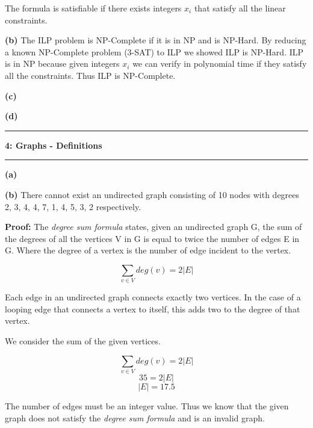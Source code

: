 \documentclass[11pt]{article}
\newcommand\question[2]{\vspace{.25in}\hrule\textbf{#1: #2}\vspace{.5em}\hrule\vspace{.10in}}
\renewcommand\part[1]{\vspace{.10in}\textbf{(#1)}}
\begin{document}
	The formula is satisfiable if there exists integers $x_i$ that satisfy all the linear constraints.
	
\part{b} The ILP problem is NP-Complete if it is in NP and is NP-Hard. By reducing a known NP-Complete problem (3-SAT) to ILP we showed ILP is NP-Hard. ILP is in NP because given integers $x_i$ we can verify in polynomial time if they satisfy all the constraints. Thus ILP is NP-Complete.

\part{c}

\part{d}

\question{4}{Graphs - Definitions}

\part{a} 

\part{b} There cannot exist an undirected graph consisting of 10 nodes with degrees 2, 3, 4, 4, 7, 1, 4, 5, 3, 2 respectively.

\textbf{Proof:} The \textit{degree sum formula} states, given an undirected graph G, the sum of the degrees of all the vertices V in G is equal to twice the number of edges E in G. Where the degree of a vertex is the number of edge incident to the vertex.

$$\sum_{v \in V} deg(v) = 2|E|$$

Each edge in an undirected graph connects exactly two vertices. In the case of a looping edge that connects a vertex to itself, this adds two to the degree of that vertex.

We consider the sum of the given vertices.

$$\sum_{v \in V} deg(v) = 2|E|$$
$$35 = 2|E|$$
$$|E| = 17.5$$

The number of edges must be an integer value. Thus we know that the given graph does not satisfy the \textit{degree sum formula} and is an invalid graph.
\end{document}
